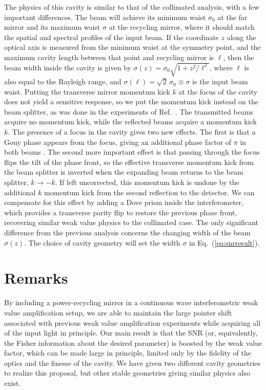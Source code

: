 The physics of this cavity is similar to that of the collimated analysis, with a few important differences.  The beam will achieve its minimum waist $\sigma_0$ at the far mirror and its maximum waist $\sigma$ at the recycling mirror, where it should match the spatial and spectral profiles of the input beam.  If the coordinate $z$ along the optical axis is measured from the minimum waist at the symmetry point, and the maximum cavity length between that point and recycling mirror is $\ell$, then the beam width inside the cavity is given by $\sigma(z) = \sigma_0\sqrt{1 + z^2/\ell^2}$, where $\ell$ is also equal to the Rayleigh range, and $\sigma(\ell) = \sqrt{2}\,\sigma_0 \equiv \sigma$ is the input beam waist. 
Putting the transverse mirror momentum kick $k$ at the focus of the cavity does not yield a sensitive response, so we put the momentum kick instead on the beam splitter, as was done in the experiments of Ref.~\cite{Viza2014}.  The transmitted beams acquire no momentum kick, while the reflected beams acquire a momentum kick $k$.
The presence of a focus in the cavity gives two new effects.  The first is that a Gouy phase appears from the focus, giving an additional phase factor of $\pi$ in both beams \cite{Milonni2010}.  The second more important effect is that passing through the focus flips the tilt of the phase front, so the effective transverse momentum kick from the beam splitter is inverted when the expanding beam returns to the beam splitter, $k \rightarrow -k$.  If left uncorrected, this momentum kick is undone by the additional $k$ momentum kick from the second reflection to the detector.  We can compensate for this effect by adding a Dove prism inside the interferometer, which provides a transverse parity flip to restore the previous phase front, recovering similar weak value physics to the collimated case.  The only significant difference from the previous analysis 
concerns the changing width of the beam $\sigma(z)$.  The choice of cavity geometry will set the width $\sigma$ in Eq.~(\ref{eq:snrresult}).



\section{Remarks}
By including a power-recycling mirror in a continuous wave interferometric weak value amplification setup, we are able to maintain the large pointer shift associated with previous weak value amplification experiments while acquiring all of the input light in principle.  Our main result is that the SNR (or, equivalently, the Fisher information about the desired parameter) is boosted by the weak value factor, which can be made large in principle, limited only by the fidelity of the optics and the finesse of the cavity.  We have given two different cavity geometries to realize this proposal, but other stable geometries giving similar physics also exist.

